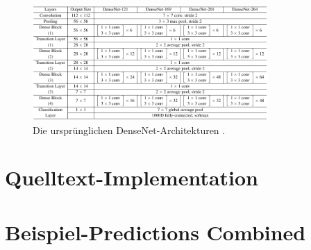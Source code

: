 \begin{figure}
	\centering
	\includegraphics[width=0.8\textwidth]{Bilder/densenet121-architecture.pdf} 
	\caption{Die ursprünglichen DenseNet-Architekturen \cite{Huang.25082016}.}
	\label{fig:densenet121-architecture}
\end{figure} 

\pagebreak

\section{Quelltext-Implementation}



\pagebreak 

\section{Beispiel-Predictions Combined}


